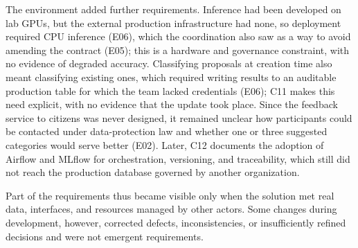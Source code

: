 \documentclass[sigconf,nonacm]{acmart}
\begin{document}
The environment added further requirements. Inference had been developed on lab GPUs, but the external production infrastructure had none, so deployment required CPU inference (E06), which the coordination also saw as a way to avoid amending the contract (E05); this is a hardware and governance constraint, with no evidence of degraded accuracy. Classifying proposals at creation time also meant classifying existing ones, which required writing results to an auditable production table for which the team lacked credentials (E06); C11 makes this need explicit, with no evidence that the update took place. Since the feedback service to citizens was never designed, it remained unclear how participants could be contacted under data-protection law and whether one or three suggested categories would serve better (E02). Later, C12 documents the adoption of Airflow and MLflow for orchestration, versioning, and traceability, which still did not reach the production database governed by another organization.

Part of the requirements thus became visible only when the solution met real data, interfaces, and resources managed by other actors. Some changes during development, however, corrected defects, inconsistencies, or insufficiently refined decisions and were not emergent requirements.



\end{document}
